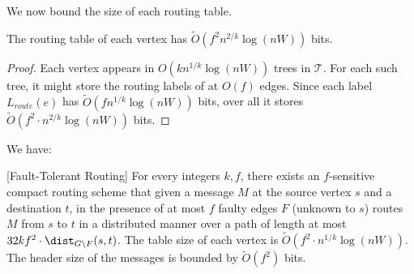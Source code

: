 %
We now bound the size of each routing table. 
\begin{claim}
The routing table of each vertex has $\widetilde{O}(f^2 n^{2/k} \log (nW))$ bits.
\end{claim}
\begin{proof}
Each vertex appears in $O(k n^{1/k} \log (nW))$ trees in $\mathcal{T}$. For each such tree, it might store the routing labels of at $O(f)$ edges. Since each label $L_{route}(e)$ has $\widetilde{O}(f n^{1/k} \log (nW))$ bits, over all it stores $\widetilde{O}(f^2 \cdot n^{2/k}\log (nW))$ bits. 
\end{proof}
%


We have:
\begin{theorem}\label{thm:routing-unknown}[Fault-Tolerant Routing]
For every integers $k,f$, there exists an $f$-sensitive compact routing scheme that given a message $M$ at the source vertex $s$ and a destination $t$, in the presence of at most $f$ faulty edges $F$ (unknown to $s$) routes $M$ from $s$ to $t$ in a distributed manner over a path of length at most $32k f^2\cdot \dist_{G \setminus F}(s,t)$. The table size of each vertex is $\widetilde{O}(f^2 \cdot n^{1/k} \log(nW))$. The header size of the messages is bounded by $\widetilde{O}(f^2)$ bits. 
\end{theorem}


